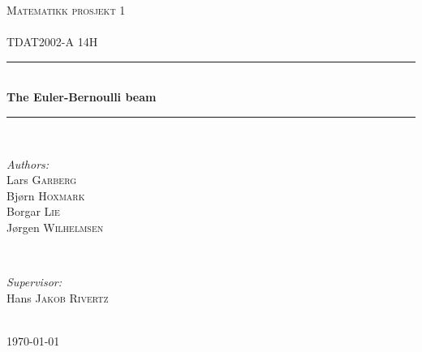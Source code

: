 

\begin{titlepage}

\newcommand{\HRule}{\rule{\linewidth}{0.5mm}} 

\center 

\textsc{\LARGE Matematikk prosjekt 1}\\[1.5cm] %
\textsc{\Large }\\[0.5cm] %
\textsc{\large TDAT2002-A 14H}\\[0.5cm] %

\HRule \\[0.4cm]
{ \huge \bfseries The Euler-Bernoulli beam}\\[0.4cm] 
\HRule \\[1.5cm]


\begin{minipage}{0.4\textwidth}
\begin{flushleft} \large
\emph{Authors:}\\
Lars \textsc{Garberg} \\
Bjørn \textsc{Hoxmark} \\
Borgar \textsc{Lie} \\
Jørgen \textsc{Wilhelmsen}

\end{flushleft}
\end{minipage}
~
\begin{minipage}{0.4\textwidth}
\begin{flushright} \large
\emph{Supervisor:} \\
 Hans \textsc{Jakob} \textsc{Rivertz} %
\end{flushright}
\end{minipage}\\[4cm]



{\large \today}\\[3cm] %


 

\vfill %

\end{titlepage}
